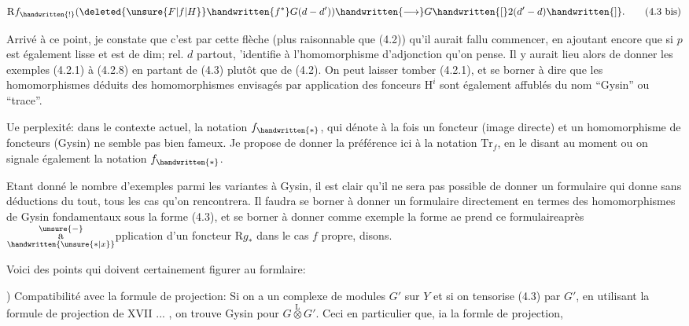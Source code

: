 
\[
\mathrm{R}f_{\handwritten{!}}(\deleted{\unsure{F|f|H}}\handwritten{f^*}G(d-d'))\handwritten{\longrightarrow}G\handwritten{[}2(d'-d)\handwritten{]}.
\tag*{(4.3 bis)}
\]

Arrivé à ce point, je constate que c'est par cette flèche (plus raisonnable que (4.2)) qu'il aurait fallu commencer, en ajoutant encore que si $p$ est également lisse et est de dim; rel. $d$ partout,  'identifie à l'homomorphisme d'adjonction qu'on pense. Il y aurait lieu alors de donner les exemples (4.2.1) à (4.2.8)  en partant de (4.3) plutôt que de (4.2). On peut laisser tomber (4.2.1), et se borner à dire que les homomorphismes déduits des homomorphismes envisagés par application des fonceurs $\mathrm{H}^i$ sont également affublés du nom \unsure{\deleted{(}|(}``Gysin'' ou ``trace''.

Ue perplexité: dans le contexte actuel, la notation $f_{\handwritten{*}}$, qui dénote à la fois un foncteur (image directe) et un homomorphisme de foncteurs (Gysin) ne semble pas bien fameux. Je propose de donner la préférence ici à la notation $\mathrm{Tr}_f$, en le disant au moment ou on signale également la notation $f_{\handwritten{*}}$.

Etant donné le nombre d'exemples parmi les variantes à Gysin, il est clair qu'il ne sera pas possible de donner un formulaire qui donne  sans déductions du tout, tous les cas qu'on rencontrera. Il faudra se borner à donner un formulaire directement en termes des homomorphismes de Gysin fondamentaux sous la forme (4.3), et se borner à donner comme exemple la forme ae prend ce formulaireaprès $\overset{\unsure{-}}{\underset{\handwritten{\unsure{*|x}}}{\mathrm{a}}}$pplication d'un foncteur $\mathrm{R}g_*$ dans le cas $f$ propre, disons.

Voici des points qui doivent certainement figurer au formlaire:

) Compatibilité avec la formule de projection: Si on a un complexe de modules $G'$ sur $Y$ et si on tensorise (4.3) par $G'$, en utilisant la formule de projection de XVII ... , on trouve Gysin pour $G\overset{\mathrm{L}}{\otimes}G'$. Ceci  en particulier que, ia la formle de projection,

